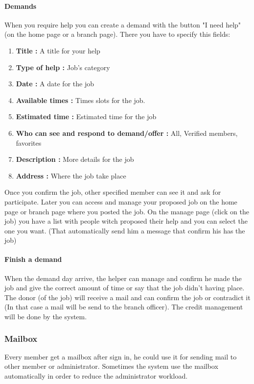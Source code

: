 \documentclass[11pt, a4paper]{article}   	%
\begin{document}
\paragraph{Demands}
When you require help you can create a demand with the button "I need help" (on the home page or a branch page). There you have to specify this fields:
\begin{enumerate}
	\item \textbf{Title :} A title for your help
	\item \textbf{Type of help :} Job's category
	\item \textbf{Date :} A date for the job
	\item \textbf{Available times :} Times slots for the job.
	\item \textbf{Estimated time :} Estimated time for the job
	\item \textbf{Who can see and respond to demand/offer :} All, Verified members, favorites
	\item \textbf{Description :} More details for the job
	\item \textbf{Address :} Where the job take place
\end{enumerate}
Once you confirm the job, other specified member can see it and ask for participate.
Later you can access and manage your proposed job on the home page or branch page where you posted the job. On the manage page (click on the job) you have a list with people witch proposed their help and you can select the one you want. (That automatically send him a message that confirm his has the job)

\paragraph{Finish a demand}
When the demand day arrive, the helper can manage and confirm he made the job and give the correct amount of time or say that the job didn't having place.
The donor (of the job) will receive a mail and can confirm the job or contradict it (In that case a mail will be send to the branch officer). The credit management will be done by the system.  

\subsubsection{Mailbox}

Every member get a mailbox after sign in, he could use it for sending mail to other member or administrator. Sometimes the system use the mailbox automatically in order to reduce the administrator workload.
\end{document}
